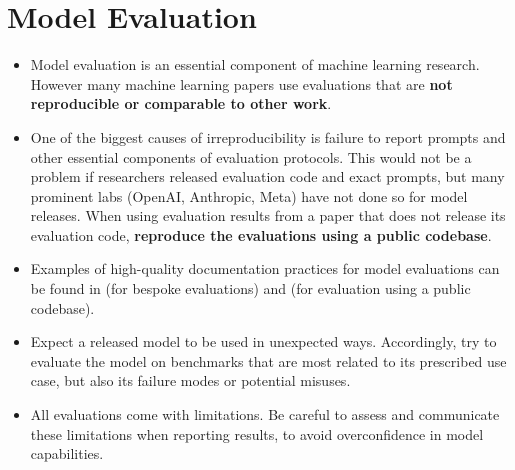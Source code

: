 \section{Model Evaluation}
\label{sec:model-eval}
\vspace{-2mm}

\begin{tcolorbox}[
    width=\textwidth,
    title={Model Evaluation Best Practices},
    colback=backgroundcol, %
    colframe=darkgray, %
    colbacktitle=dataprep, %
    coltitle=white, %
    coltext=black %
]

\begin{itemize}[itemsep=0pt, wide=3pt]
    \item Model evaluation is an essential component of machine learning research. However many machine learning papers use evaluations that are \textbf{not reproducible or comparable to other work}.
    \item One of the biggest causes of irreproducibility is failure to report prompts and other essential components of evaluation protocols. This would not be a problem if researchers released evaluation code and exact prompts, but many prominent labs (OpenAI, Anthropic, Meta) have not done so for model releases. When using evaluation results from a paper that does not release its evaluation code, \textbf{reproduce the evaluations using a public codebase}.
    \item Examples of high-quality documentation practices for model evaluations can be found in \citet{browngpt3} (for bespoke evaluations) and \citet{black2022gpt,scao2022bloom,biderman2023pythia} (for evaluation using a public codebase).
    \item Expect a released model to be used in unexpected ways. Accordingly, try to evaluate the model on benchmarks that are most related to its prescribed use case, but also its failure modes or potential misuses.
    \item All evaluations come with limitations. Be careful to assess and communicate these limitations when reporting results, to avoid overconfidence in model capabilities.
\end{itemize}
\end{tcolorbox}

